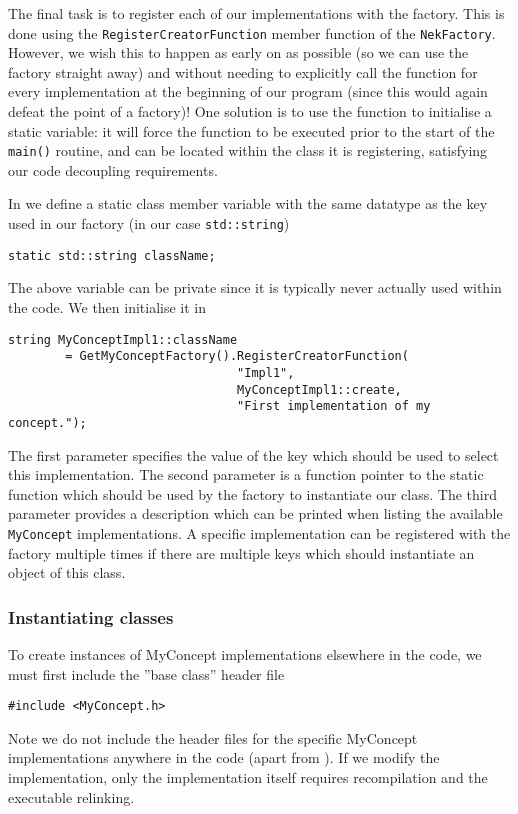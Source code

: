 The final task is to register each of our implementations with the factory. This is done 
using the \lstinline{RegisterCreatorFunction} member function of the \lstinline{NekFactory}.
However, we wish this to happen as early on as possible (so we can use the 
factory straight away) and without needing to explicitly call the function for 
every implementation at the beginning of our program (since this would again 
defeat the point of a factory)! One solution is to use the function to 
initialise a static variable: it will force the function to be executed prior to the start of the \lstinline{main()} routine, and can be located within the class it is registering, satisfying our code decoupling requirements.

In  we define a static class member variable with the same datatype as the key used in our factory (in our case \lstinline{std::string}) 
\begin{lstlisting}
static std::string className;
\end{lstlisting}
The above variable can be private since it is typically never actually
used within the code. We then initialise it in 
\begin{lstlisting}
string MyConceptImpl1::className
        = GetMyConceptFactory().RegisterCreatorFunction(
                                "Impl1", 
                                MyConceptImpl1::create, 
                                "First implementation of my concept.");
\end{lstlisting}
The first parameter specifies the value of the key which should be used to
select this implementation. The second parameter is a function pointer to the
static function which should be used by the factory to instantiate our class. The third parameter provides a description which can be printed when listing the available \lstinline{MyConcept} implementations. A specific implementation can be registered with the factory multiple times if there are multiple keys which should instantiate an object of this class.


\subsubsection{Instantiating classes}
To create instances of MyConcept implementations elsewhere in the code, we must
first include the ''base class'' header file
\begin{lstlisting}
#include <MyConcept.h>
\end{lstlisting}
Note we do not include the header files for the specific MyConcept 
implementations anywhere in the code (apart from ).
If we modify the implementation, only the implementation itself requires 
recompilation and the executable relinking.

